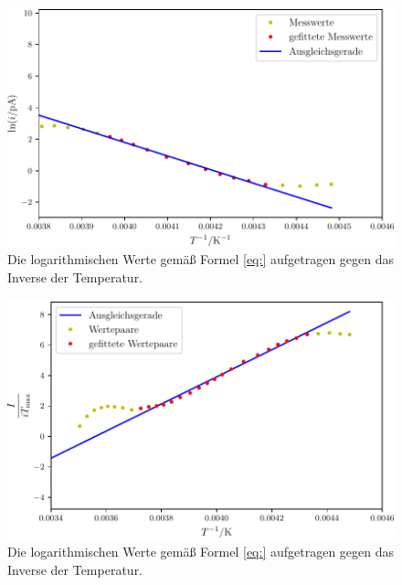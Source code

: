 \begin{figure}
	\centering
	\includegraphics[width=\linewidth-60pt,height=\textheight-60pt,keepaspectratio]{content/images/W1_1.pdf}
	\caption{Die logarithmischen Werte gemäß Formel \eqref{eq:} aufgetragen gegen das Inverse der Temperatur.}
	\label{fig:W1_1}
\end{figure}

\begin{figure}
	\centering
	\includegraphics[width=\linewidth-60pt,height=\textheight-60pt,keepaspectratio]{content/images/W1_2.pdf}
	\caption{Die logarithmischen Werte gemäß Formel \eqref{eq:} aufgetragen gegen das Inverse der Temperatur.}
	\label{fig:W1_2}
\end{figure}

%	


